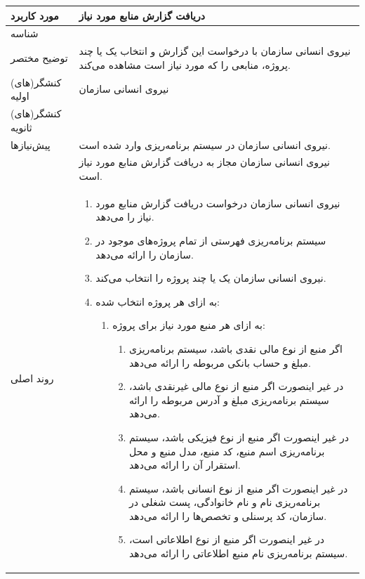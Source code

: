 \begin{table}[H]
	\centering
	\begin{tabular}{|p{3cm}|p{10cm}|}
		\hline
		
		
		مورد کاربرد & دریافت گزارش منابع مورد نیاز  \\
		\hline
		
		شناسه & 
		\stepcounter{usecase_ID}
		
		\arabic{usecase_ID} \\
		
		\hline
		
		توضیح مختصر & نیروی انسانی سازمان با درخواست این گزارش و انتخاب یک یا چند پروژه، منابعی را که مورد نیاز است مشاهده می‌کند. \\
		\hline
		
		کنشگر(های) اولیه& نیروی انسانی سازمان \\
		\hline
		
		کنشگر(های) ثانویه&  \\
		\hline
		
		پیش‌نیازها
		& نیروی انسانی سازمان در سیستم برنامه‌ریزی وارد شده است.\\
		& نیروی انسانی سازمان مجاز به دریافت گزارش منابع مورد نیاز است. \\
		\hline
		
		
		روند اصلی &
		\begin{enumerate}[topsep=0cm,leftmargin=0.5cm]
			\item نیروی انسانی سازمان درخواست دریافت گزارش منابع مورد نیاز را می‌دهد.
			\item سیستم برنامه‌ریزی فهرستی از تمام پروژه‌های موجود در سازمان را ارائه می‌دهد. 
			\item نیروی انسانی سازمان یک یا چند پروژه را انتخاب می‌کند.
			\item به ازای هر پروژه انتخاب شده:
			\begin{enumerate}[topsep=0cm,leftmargin=0.5cm]
				\item به ازای هر منبع مورد نیاز برای پروژه:
				\begin{enumerate}[topsep=0cm,leftmargin=0.5cm]
					\item اگر منبع از نوع مالی نقدی باشد، سیستم برنامه‌ریزی مبلغ و حساب بانکی مربوطه را ارائه می‌دهد.
					\item در غیر اینصورت اگر منبع از نوع مالی غیرنقدی باشد، سیستم برنامه‌ریزی مبلغ و آدرس مربوطه را ارائه می‌دهد.
					\item در غیر اینصورت اگر منبع از نوع فیزیکی باشد، سیستم برنامه‌ریزی اسم منبع، کد منبع، مدل منبع و محل استقرار آن را ارائه می‌دهد.
					\item در غیر اینصورت اگر منبع از نوع انسانی باشد، سیستم برنامه‌ریزی نام و نام خانوادگی، پست شغلی در سازمان، کد پرسنلی و تخصص‌ها را ارائه می‌دهد.
					\item در غیر اینصورت اگر منبع از نوع اطلاعاتی است، سیستم برنامه‌ریزی نام منبع اطلاعاتی را ارائه می‌دهد.
				\end{enumerate}
			\end{enumerate}
		\end{enumerate} \\
		\hline
		

\end{tabular}
\end{table}

